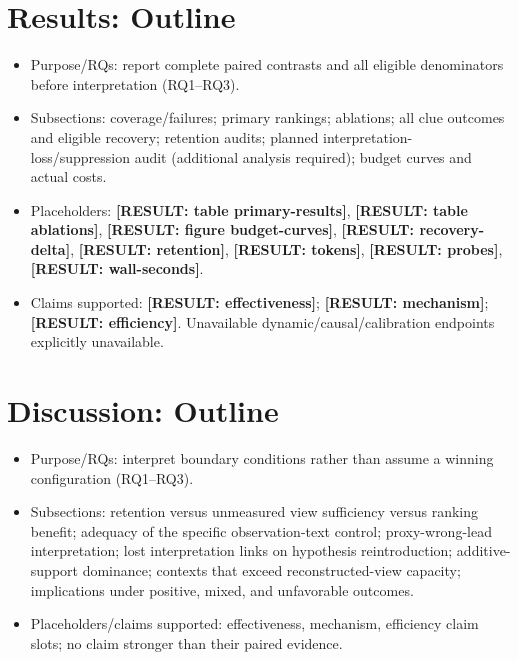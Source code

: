 \documentclass[letterpaper,journal]{IEEEtran}
\makeatletter
\newcommand{\resultslot}[1]{\textcolor{blue!65!black}{\textbf{[RESULT: #1]}}}
\newcommand{\res}[1]{\resultslot{#1}}
\newcommand{\claimslot}[1]{\resultslot{#1}}
\newcommand{\figslot}[1]{\resultslot{figure #1}}
\newcommand{\tabslot}[1]{\resultslot{table #1}}
\newcommand{\boundresult}[1]{\ifcsname result@#1\endcsname\csname result@#1\endcsname\else\PackageError{morph-results}{Missing result key #1}{Supply audited binding}\fi}
\newcommand{\res}[1]{\boundresult{#1}}
\newcommand{\claimslot}[1]{\boundresult{#1}}
\newcommand{\figslot}[1]{\boundresult{#1}}
\newcommand{\tabslot}[1]{\boundresult{#1}}
\makeatother
\begin{document}
\section{Results: Outline}
\begin{itemize}
\item Purpose/RQs: report complete paired contrasts and all eligible denominators before interpretation (RQ1--RQ3).
\item Subsections: coverage/failures; primary rankings; ablations; all clue outcomes and eligible recovery; retention audits; planned interpretation-loss/suppression audit (additional analysis required); budget curves and actual costs.
\item Placeholders: \tabslot{primary-results}, \tabslot{ablations}, \figslot{budget-curves}, \res{recovery-delta}, \res{retention}, \res{tokens}, \res{probes}, \res{wall-seconds}.
\item Claims supported: \claimslot{effectiveness}; \claimslot{mechanism}; \claimslot{efficiency}. Unavailable dynamic/causal/calibration endpoints explicitly unavailable.
\end{itemize}

\section{Discussion: Outline}
\begin{itemize}
\item Purpose/RQs: interpret boundary conditions rather than assume a winning configuration (RQ1--RQ3).
\item Subsections: retention versus unmeasured view sufficiency versus ranking benefit; adequacy of the specific observation-text control; proxy-wrong-lead interpretation; lost interpretation links on hypothesis reintroduction; additive-support dominance; contexts that exceed reconstructed-view capacity; implications under positive, mixed, and unfavorable outcomes.
\item Placeholders/claims supported: effectiveness, mechanism, efficiency claim slots; no claim stronger than their paired evidence.
\end{itemize}
\end{document}
